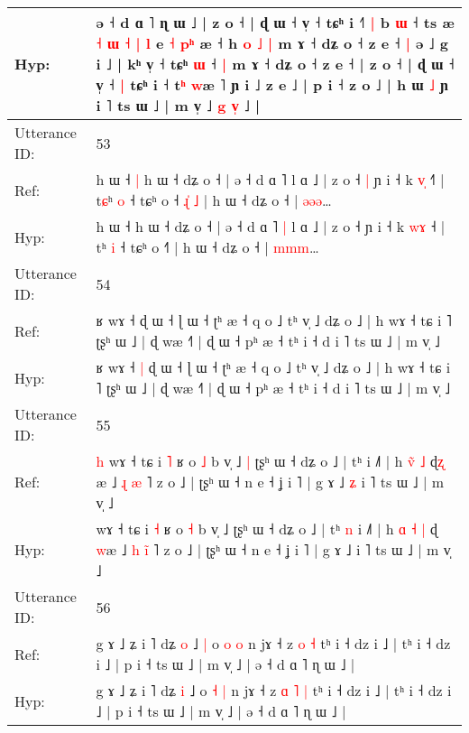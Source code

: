 \documentclass[10pt]{article}
\DeclareRobustCommand{\hl}[1]{{\textcolor{red}{#1}}}
\begin{document}
\begin{longtable}{ll}
 \\
Hyp: & ə ˧ d ɑ ˥ ɳ ɯ ˩ | z o ˧ | ɖ ɯ ˧ v̩ ˧ tɕʰ i ˧\hl{˥}\hl{ }\hl{|} b \hl{ɯ} ˧ ts æ \hl{˧} \hl{ɯ} \hl{˧} \hl{|} \hl{l} e \hl{˧} \hl{}\hl{p}\hl{ʰ} æ ˧\hl{} h \hl{o}\hl{ }\hl{˩} \hl{|} m ɤ ˧ dʑ o ˧ z e ˧\hl{ }\hl{|} ə ˩ g i ˩ | kʰ v̩ ˧ tɕʰ \hl{ɯ} ˧\hl{ }\hl{|} m ɤ ˧ dʑ o ˧ z e ˧ | z o ˧ | ɖ ɯ ˧ v̩ ˧\hl{ }\hl{|} tɕʰ i ˧ t\hl{ʰ} \hl{w}æ ˥ ɲ i ˩ z e ˩ | p i ˧ z o ˩ | h ɯ \hl{˩} ɲ i ˥ ts ɯ ˩ | m v̩ ˩ \hl{g} \hl{v}\hl{̩} ˩\hl{} |
 \\
\midrule
Utterance ID: & 53 \\
Ref: & h ɯ ˧\hl{ }\hl{|} h ɯ ˧ dʑ o ˧ | ə ˧ d ɑ ˥\hl{}\hl{} l ɑ ˩ | z o ˧\hl{ }\hl{|} ɲ i ˧ k \hl{v}\hl{̩} ˧\hl{˥} | t\hl{ɕ}ʰ \hl{o} ˧ tɕʰ o ˧\hl{ }\hl{ɻ}\hl{̍}\hl{ }\hl{˩} | h ɯ ˧ dʑ o ˧ | \hl{ə}\hl{ə}\hl{ə}…
 \\
Hyp: & h ɯ ˧\hl{}\hl{} h ɯ ˧ dʑ o ˧ | ə ˧ d ɑ ˥\hl{ }\hl{|} l ɑ ˩ | z o ˧\hl{}\hl{} ɲ i ˧ k \hl{w}\hl{ɤ} ˧\hl{} | t\hl{}ʰ \hl{i} ˧ tɕʰ o ˧\hl{}\hl{}\hl{}\hl{}\hl{˥} | h ɯ ˧ dʑ o ˧ | \hl{m}\hl{m}\hl{m}…
 \\
\midrule
Utterance ID: & 54 \\
Ref: & ʁ wɤ ˧\hl{}\hl{} ɖ ɯ ˧ ɭ ɯ ˧ ʈʰ æ ˧ q o ˩ tʰ v̩ ˩ dʑ o ˩ | h wɤ ˧ tɕ i ˥ ʈʂʰ ɯ ˩ | ɖ wæ ˧˥ | ɖ ɯ ˧ pʰ æ ˧ tʰ i ˧ d i ˥ ts ɯ ˩ | m v̩ ˩
 \\
Hyp: & ʁ wɤ ˧\hl{ }\hl{|} ɖ ɯ ˧ ɭ ɯ ˧ ʈʰ æ ˧ q o ˩ tʰ v̩ ˩ dʑ o ˩ | h wɤ ˧ tɕ i ˥ ʈʂʰ ɯ ˩ | ɖ wæ ˧˥ | ɖ ɯ ˧ pʰ æ ˧ tʰ i ˧ d i ˥ ts ɯ ˩ | m v̩ ˩
 \\
\midrule
Utterance ID: & 55 \\
Ref: & \hl{h}\hl{ }wɤ ˧ tɕ i \hl{˥} ʁ o \hl{˩} b v̩ ˩\hl{ }\hl{|} ʈʂʰ ɯ ˧ dʑ o ˩ | tʰ\hl{}\hl{} i ˩˥ | h \hl{}\hl{v}\hl{̃} \hl{˩} ɖ\hl{ʐ}\hl{ }æ ˩ \hl{ɻ} \hl{}\hl{æ} ˥ z o ˩ | ʈʂʰ ɯ ˧ n e ˧ ʝ i ˥ | g ɤ ˩\hl{ }\hl{ʑ} i ˥ ts ɯ ˩ | m v̩ ˩
 \\
Hyp: & \hl{}\hl{}wɤ ˧ tɕ i \hl{˧} ʁ o \hl{˧} b v̩ ˩\hl{}\hl{} ʈʂʰ ɯ ˧ dʑ o ˩ | tʰ\hl{ }\hl{n} i ˩˥ | h \hl{ɑ}\hl{ }\hl{˧} \hl{|} ɖ\hl{ }\hl{w}æ ˩ \hl{h} \hl{i}\hl{̃} ˥ z o ˩ | ʈʂʰ ɯ ˧ n e ˧ ʝ i ˥ | g ɤ ˩\hl{}\hl{} i ˥ ts ɯ ˩ | m v̩ ˩
 \\
\midrule
Utterance ID: & 56 \\
Ref: & g ɤ ˩ ʑ i ˥ dʑ \hl{o} ˩\hl{ }\hl{|} o \hl{o} \hl{o} n jɤ ˧ z\hl{}\hl{} \hl{o} \hl{˧} tʰ i ˧ dz i ˩ | tʰ i ˧ dz i ˩ | p i ˧ ts ɯ ˩ | m v̩ ˩ | ə ˧ d ɑ ˥ ɳ ɯ ˩ |
 \\
Hyp: & g ɤ ˩ ʑ i ˥ dʑ \hl{i} ˩\hl{}\hl{} o \hl{˧} \hl{|} n jɤ ˧ z\hl{ }\hl{ɑ} \hl{˥} \hl{|} tʰ i ˧ dz i ˩ | tʰ i ˧ dz i ˩ | p i ˧ ts ɯ ˩ | m v̩ ˩ | ə ˧ d ɑ ˥ ɳ ɯ ˩ |

\end{longtable}
\end{document}

